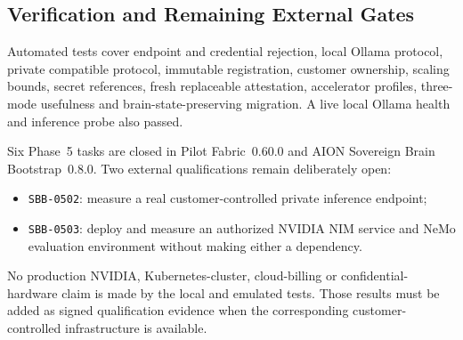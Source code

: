 \subsection{Verification and Remaining External Gates}

Automated tests cover endpoint and credential rejection, local Ollama protocol, private
compatible protocol, immutable registration, customer ownership, scaling bounds, secret
references, fresh replaceable attestation, accelerator profiles, three-mode usefulness and
brain-state-preserving migration.  A live local Ollama health and inference probe also passed.

Six Phase~5 tasks are closed in Pilot Fabric~0.60.0 and AION Sovereign Brain
Bootstrap~0.8.0.  Two external qualifications remain deliberately open:
\begin{itemize}
  \item \texttt{SBB-0502}: measure a real customer-controlled private inference endpoint;
  \item \texttt{SBB-0503}: deploy and measure an authorized NVIDIA NIM service and NeMo
        evaluation environment without making either a dependency.
\end{itemize}
No production NVIDIA, Kubernetes-cluster, cloud-billing or confidential-hardware claim is
made by the local and emulated tests.  Those results must be added as signed qualification
evidence when the corresponding customer-controlled infrastructure is available.
